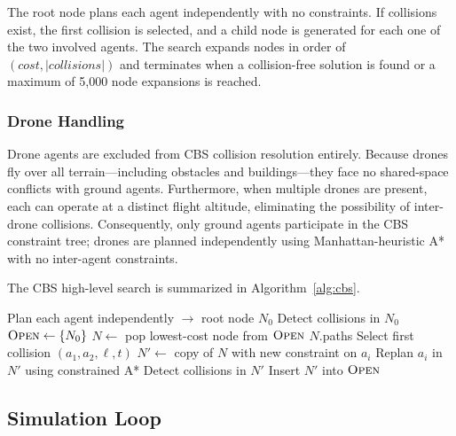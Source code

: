\documentclass[conference]{IEEEtran}
\begin{document}
The root node plans each agent independently with no constraints. If collisions exist, the first collision is selected, and a child node is generated for each one of the two involved agents. The search expands nodes in order of $(cost, |collisions|)$ and terminates when a collision-free solution is found or a maximum of 5{,}000 node expansions is reached.

\subsubsection{Drone Handling}
Drone agents are excluded from CBS collision resolution entirely. Because drones fly over all terrain---including obstacles and buildings---they face no shared-space conflicts with ground agents. Furthermore, when multiple drones are present, each can operate at a distinct flight altitude, eliminating the possibility of inter-drone collisions. Consequently, only ground agents participate in the CBS constraint tree; drones are planned independently using Manhattan-heuristic A* with no inter-agent constraints.

The CBS high-level search is summarized in Algorithm~\ref{alg:cbs}.

\begin{algorithm}[t]
\caption{CBS High-Level Search}
\label{alg:cbs}
\begin{algorithmic}[1]
\STATE Plan each agent independently $\to$ root node $N_0$
\STATE Detect collisions in $N_0$
\STATE $\textsc{Open} \gets \{N_0\}$
    \STATE $N \gets$ pop lowest-cost node from $\textsc{Open}$
        \RETURN $N$.paths
    \ENDIF
    \STATE Select first collision $(a_1, a_2, \ell, t)$
        \STATE $N' \gets$ copy of $N$ with new constraint on $a_i$
        \STATE Replan $a_i$ in $N'$ using constrained A*
        \STATE Detect collisions in $N'$
        \STATE Insert $N'$ into $\textsc{Open}$
    \ENDFOR
\ENDWHILE
\end{algorithmic}
\end{algorithm}

\subsection{Simulation Loop}
\end{document}
